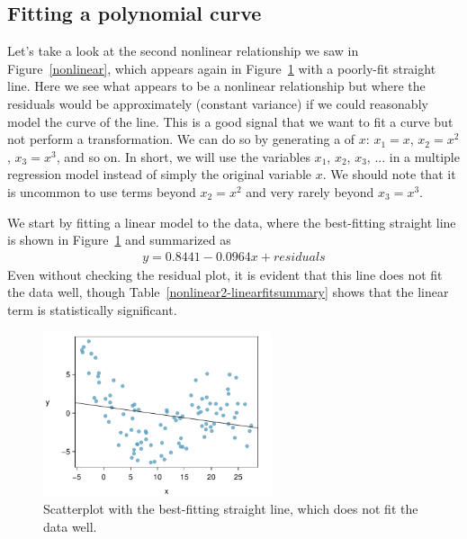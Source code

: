 \subsection{Fitting a polynomial curve}
\label{fittingAPolynomialCurve}


Let's take a look at the second nonlinear relationship we saw in Figure~\ref{nonlinear}, which appears again in Figure~\ref{nonlinear2-2} with a poorly-fit straight line. Here we see what appears to be a nonlinear relationship but where the residuals would be approximately  (constant variance) if we could reasonably model the curve of the line. This is a good signal that we want to fit a curve but not perform a transformation. We can do so by generating a  of $x$: $x_1=x$, $x_2 = x^2$, $x_3 = x^3$, and so on. In short, we will use the variables $x_1$, $x_2$, $x_3$, ... in a multiple regression model instead of simply the original variable $x$. We should note that it is uncommon to use terms beyond $x_2 = x^2$ and very rarely beyond $x_3=x^3$.

We start by fitting a linear model to the data, where the best-fitting straight line is shown in Figure~\ref{nonlinear2-2} and summarized as
\begin{align*}
y = 0.8441 - 0.0964x + residuals
\end{align*}
Even without checking the residual plot, it is evident that this line does not fit the data well, though Table~\ref{nonlinear2-linearfitsummary} shows that the linear term is statistically significant.

\begin{figure}
\centering
\includegraphics[width=0.6\textwidth]{RegressionExtras/figures/nonlinear/nonlinear2-2}
\caption{Scatterplot with the best-fitting straight line, which does not fit the data well.}
\label{nonlinear2-2}
\end{figure}

